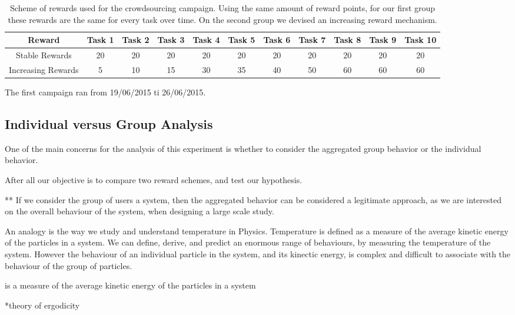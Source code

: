 \documentclass[letterpaper]{article}
\begin{document}
\begin{table}[!h]
	\caption{ Scheme of rewards used for the crowdsourcing campaign. Using the same amount of reward points, for our first group these rewards are the same for every task over time. On the second group we devised an increasing reward mechanism. }
	\begin{center}
\begin{tabular}{|c|c|c|c|c|c|c|c|c|c|c|}
	\hline  Reward & Task 1  & Task 2  & Task 3  & Task 4 & Task 5 & Task 6 & Task 7 & Task 8 & Task 9 & Task 10 \\ 
	\hline  Stable Rewards & 20 & 20 & 20 & 20 & 20 & 20 & 20 & 20 & 20 & 20 \\ 
	\hline Increasing Rewards & 5 & 10 & 15 & 30 & 35 & 40 & 50 & 60 & 60 & 60 \\ 
	\hline 
\end{tabular} 
\end{center}
\label{tab:rewards}
\end{table}


The first campaign ran from 19/06/2015 ti 26/06/2015. 

\subsection{Individual versus Group Analysis}

One of the main concerns for the analysis of this experiment is whether to consider the aggregated group behavior or the individual behavior.

After all our objective is to compare two reward schemes, and test our hypothesis. 

** If we consider the group of users a system, then the aggregated behavior can be considered a legitimate approach, as we are interested on the overall behaviour of the system, when designing a large scale study. 

An analogy is the way we study and understand temperature in Physics. Temperature is defined as a measure of the average kinetic energy of the particles in a system. We can define, derive, and predict an enormous range of behaviours, by measuring the temperature of the system. However the behaviour of an individual particle in the system, and its kinectic energy, is complex and difficult to associate with the behaviour of the group of particles.

is a measure of the average kinetic energy of the particles in a system

*theory of ergodicity
\end{document}
